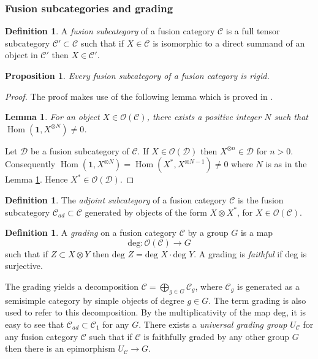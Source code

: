 \documentclass[a4paper, 10pt]{book}
\newtheorem{Lem}[theorem]{Lemma}
\newtheorem{Prop}[theorem]{Proposition}
\theoremstyle{definition}
\newtheorem{Def}[theorem]{Definition}
\numberwithin{equation}{chapter}
\newcommand\ot{\otimes}
\newcommand\Hom{\operatorname{Hom}}
\newcommand\C{\mathcal C}
\newcommand\OO{\mathcal O}
\newcommand\D{\mathcal D}
\newcommand{\ra}\rightarrow
\newcommand\one{\mathbf{1}}
\begin{document}
\subsubsection{Fusion subcategories and grading}
\begin{Def}
A \textit{fusion subcategory}  of a fusion category $\C$ is a full tensor subcategory $\C'\subset \C$ such that if $X\in \C$ is isomorphic to a direct summand of an object in $\C'$ then $X\in \C'$.
\end{Def}
\begin{Prop}
Every fusion subcategory of a fusion category is rigid.
 \end{Prop} 
\begin{proof}
The proof makes use of the following lemma which is proved in \cite[Lemma F.6]{MR2609644}.
\begin{Lem}\label{N}
For an object $X\in \OO(\C)$, there exists a positive integer $N$ such that $\Hom(\one, X^{\ot N}) \neq 0$.
\end{Lem}
Let $\D$ be a fusion subcategory of $\C$. If $X\in \OO(\D)$ then $X^{\ot n}\in \D$ for $n>0$. Consequently $\Hom(\one, X^{\ot N}) = \Hom(X^*, X^{\ot N-1})\neq 0$ where $N$ is as in the Lemma \ref{N}. Hence $X^*\in \OO(\D)$.
\end{proof}
 \begin{Def}
 The \textit{adjoint subcategory} of a fusion category $\C$ is the fusion subcategory $\C_{ad} \subset \C$ generated by objects of the form $X\otimes X^*$, for $X\in \OO(\C)$.
 \end{Def}
\begin{Def}
A \textit{grading} on a fusion category $\C$ by a group $G$ is a map \begin{equation*}
	\text{deg}: \OO(\C) \rightarrow G \label{deg}
\end{equation*}
such that if $Z\subset X\otimes Y$ then $\text{deg } Z = \text{deg } X\cdot \text{deg } Y$. A grading is \textit{faithful} if deg is surjective. 
\end{Def}

The grading yields a decomposition $\C = \bigoplus_{g\in G}\C_g$, where $\C_g$ is generated as a semisimple category by simple objects of degree $g\in G$. The term grading is also used to refer to this decomposition. By the multiplicativity of the map deg, it is easy to see that $\C_{ad}\subset \C_1$ for any $G$. There exists a \textit{universal grading group} $U_\C$ for any fusion category $\C$ such that if $\C$ is  faithfully graded by any other group $G$ then there is an epimorphism $U_{\C}\ra G$.
\end{document}
